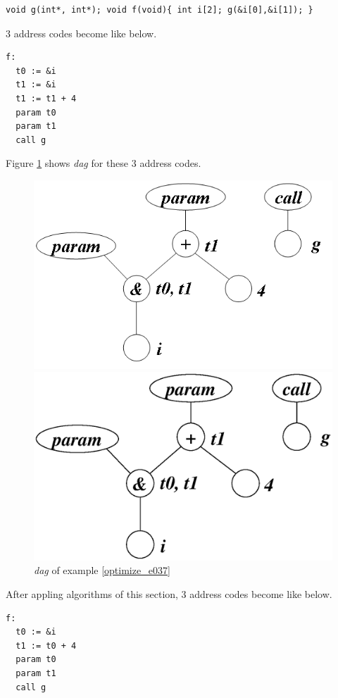 \begin{Example}
\label{optimize_e037}
\begin{verbatim}
void g(int*, int*); void f(void){ int i[2]; g(&i[0],&i[1]); }
\end{verbatim}
3 address codes become like below.
\begin{verbatim}
f:
  t0 := &i
  t1 := &i
  t1 := t1 + 4
  param t0
  param t1
  call g
\end{verbatim}
Figure \ref{optimize_e038} shows {\em dag} for these 3 address codes.
\begin{figure}[htbp]
\begin{center}
\begin{htmlonly}
\includegraphics[width=1.0\linewidth,height=0.623\linewidth]{opt020.png}
\end{htmlonly}
\begin{latexonly}
\includegraphics[width=1.0\linewidth,height=0.623\linewidth]{opt020.eps}
\end{latexonly}
\caption{{\em dag} of example \ref{optimize_e037}}
\label{optimize_e038}
\end{center}
\end{figure}
After appling algorithms of this section,
3 address codes become like below.
\begin{verbatim}
f:
  t0 := &i
  t1 := t0 + 4
  param t0
  param t1
  call g
\end{verbatim}
\end{Example}

